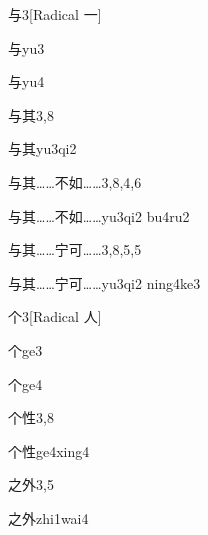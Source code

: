 \begin{entry}{与}{3}[Radical 一]
  \begin{phonetics}{与}{yu3}
  \end{phonetics}
  \begin{phonetics}{与}{yu4}
  \end{phonetics}
\end{entry}

\begin{entry}{与其}{3,8}
  \begin{phonetics}{与其}{yu3qi2}
  \end{phonetics}
\end{entry}

\begin{entry}{与其……不如……}{3,8,4,6}
  \begin{phonetics}{与其……不如……}{yu3qi2 bu4ru2}
  \end{phonetics}
\end{entry}

\begin{entry}{与其……宁可……}{3,8,5,5}
  \begin{phonetics}{与其……宁可……}{yu3qi2 ning4ke3}
  \end{phonetics}
\end{entry}

\begin{entry}{个}{3}[Radical 人]
  \begin{phonetics}{个}{ge3}
  \end{phonetics}
  \begin{phonetics}{个}{ge4}
  \end{phonetics}
\end{entry}

\begin{entry}{个性}{3,8}
  \begin{phonetics}{个性}{ge4xing4}
  \end{phonetics}
\end{entry}

\begin{entry}{之外}{3,5}
  \begin{phonetics}{之外}{zhi1wai4}
  \end{phonetics}
\end{entry}

